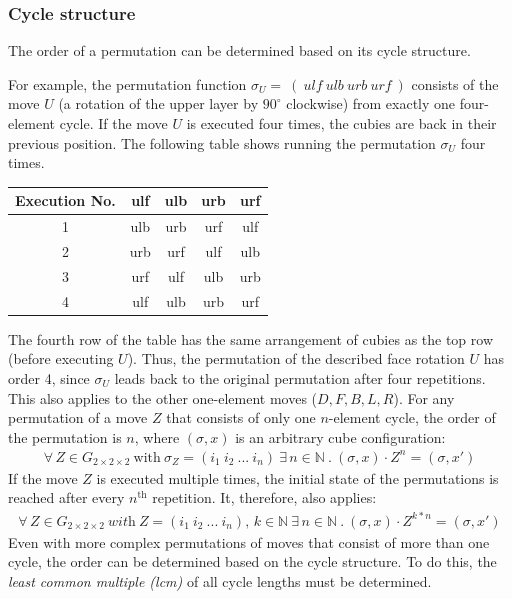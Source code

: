 \documentclass[12pt,a4paper]{article}
\theoremstyle{custom}
\newcommand{\Gtwo}{\ensuremath{G_{2\times 2\times 2}}}
\begin{document}
\subsubsection*{Cycle structure}
\label{section_cycle structure}

The order of a permutation can be determined based on its cycle structure. 

For example, the permutation function $\sigma_U =\ ( \ \textit{ulf} \ \textit{ulb} \ \textit{urb} \ \textit{urf} \ ) $ consists of the move $U$ (a rotation of the upper layer by $90 ^\circ$ clockwise) from exactly one four-element cycle.
If the move $U$ is executed four times, the cubies are back in their previous position. The following table shows running the permutation $\sigma_U$ four times.
\begin{center}
\begin{tabular}{ccccc}
\toprule
\textbf{Execution No.} & \textbf{ulf} & \textbf{ulb} & \textbf{urb} & \textbf{urf} \\
\midrule
1 & ulb & urb & urf & ulf \\

2 & urb & urf & ulf & ulb \\

3 & urf & ulf & ulb & urb \\

4 & ulf & ulb & urb & urf \\
\bottomrule
\end{tabular}
\end{center}

The fourth row of the table has the same arrangement of cubies as the top row (before executing $U$).
Thus, the permutation of the described face rotation $U$ has order 4, since $\sigma_U$ leads back to the original permutation after four repetitions. This also applies to the other one-element moves ($D, F, B, L, R$).
For any permutation of a move $Z$ that consists of only one $n$-element cycle, the order of the permutation is $n$, where $(\sigma, x)$ is an arbitrary cube configuration:
\begin{align*}
\forall \, Z \in \Gtwo \ \text{with} \ \sigma_Z=(i_1 \ i_2 \ ... \ i_n) \ \exists \, n \in \mathbb{N} \ . \ (\sigma, x) \cdot Z^n= (\sigma, x')
\end{align*}
If the move $Z$ is executed multiple times, the initial state of the permutations is reached \cite{TD} after every $n^\text{th}$ repetition.
It, therefore, also applies:
\begin{align*}
\forall \, Z \in \Gtwo \ \textit{with} \ Z=(i_1 \ i_2 \ ... \ i_n), \, k \in \mathbb{N} \ \exists \, n \in \mathbb {N} \ . \ {(\sigma, x) \cdot Z^{k*n}=(\sigma, x') }
\end{align*}
Even with more complex permutations of moves that consist of more than one cycle, the order can be determined based on the cycle structure. To do this, the \textit{least common multiple (lcm)} of all cycle lengths must be determined. \cite{TD}
\newpage
 
\end{document}
